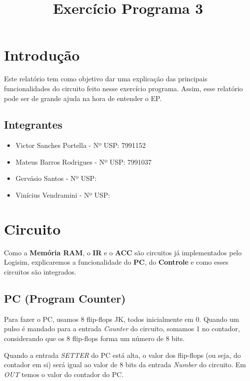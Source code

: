 \documentclass[11pt]{article}
\title{Exercício Programa 3}
\begin{document}
\maketitle

\section{Introduç\~ao}

Este relatório tem como objetivo dar uma explicação das principais funcionalidades do circuito feito nesse exercício programa. Assim, esse relatório pode ser de grande ajuda na hora de entender o EP.


\subsection*{Integrantes}

\begin{itemize}

\item Victor Sanches Portella - Nº USP: 7991152

\item Mateus Barros Rodrigues - Nº USP: 7991037

\item Gervásio Santos - Nº USP:

\item Vinícius Vendramini - Nº USP: 

\end{itemize}

\section{Circuito}

Como a \textbf{Memória RAM}, o \textbf{IR}  e o \textbf{ACC} são circuitos já implementados pelo Logisim, explicaremos a funcionalidade do \textbf{PC}, do \textbf{Controle} e como esses circuitos são integrados. 

\subsection{PC (Program Counter)}

Para fazer o PC, usamos 8 flip-flops JK, todos inicialmente em 0. Quando um pulso é mandado para a entrada \emph{Counter} do circuito, somamos 1 no contador, considerando que os 8 flip-flops forma um número de 8 bits.

Quando a entrada \emph{SETTER} do PC está alta, o valor dos flip-flops (ou seja, do contador em si) será igual ao valor de 8 bits da entrada 	\emph{Number} do circuito. Em \emph{OUT} temos o valor do contador do PC.
\end{document}
